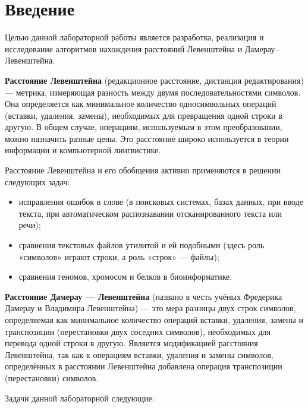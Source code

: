 \chapter*{Введение}

Целью данной лабораторной работы является разработка, реализация и исследование алгоритмов нахождения расстояний Левенштейна и Дамерау--Левенштейна.

\textbf{Расстояние Левенштейна}  (редакционное расстояние, дистанция редактирования) — метрика, измеряющая разность между двумя последовательностями символов. Она определяется как минимальное количество односимвольных операций (вставки, удаления, замены), необходимых для превращения одной строки в другую. В общем случае, операциям, используемым в этом преобразовании, можно назначить разные цены. Это расстояние широко используется в теории информации и компьютерной лингвистике.


Расстояние Левенштейна \cite{Levenshtein} и его обобщения активно применяются в решении следующих задач:
\begin{itemize}
	\item исправления ошибок в слове (в поисковых системах, базах данных, при вводе текста, при автоматическом распознавании отсканированного текста или речи);
	\item сравнения текстовых файлов утилитой  и ей подобными (здесь роль «символов» играют строки, а роль «строк» — файлы);
	\item сравнения геномов, хромосом и белков в биоинформатике.
\end{itemize}

\textbf{Расстояние Дамерау — Левенштейна} (названо в честь учёных Фредерика Дамерау и Владимира Левенштейна) — это мера разницы двух строк символов, определяемая как минимальное количество операций вставки, удаления, замены и транспозиции (перестановки двух соседних символов), необходимых для перевода одной строки в другую. Является модификацией расстояния Левенштейна, так как к операциям вставки, удаления и замены символов, определённых в расстоянии Левенштейна добавлена операция транспозиции (перестановки) символов.

\newpage

Задачи данной лабораторной следующие:

